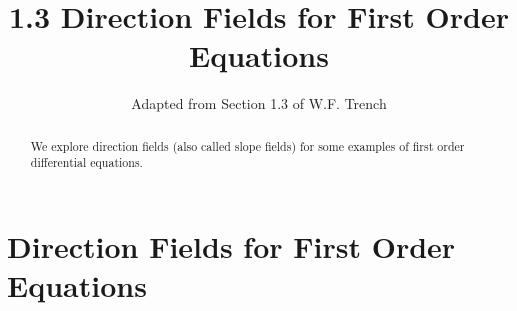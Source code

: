 \documentclass{ximera}
\title{1.3 Direction Fields for First Order Equations}
\author{Adapted from Section 1.3 of W.F. Trench}
\begin{document}
 
\begin{abstract}
We explore direction fields (also called slope fields) for some examples of first order differential equations.
\end{abstract}
 
\maketitle
 
\section*{Direction Fields for First Order Equations}
 
 
   
 
\end{document}
